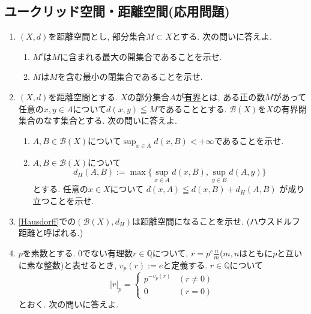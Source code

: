 \documentclass[dvipdfmx,a4paper,11pt]{article}
\newcommand{\Q}{\mathbb{Q}}
\theoremstyle{definition}
\begin{document}
 \begin{center}
\section{ユークリッド空間・距離空間(応用問題)}
\label{sec-11}
\end{center}

 


\begin{enumerate}[label=\textbf{問}\ref*{sec-11}.\arabic*]
 
  \item $(X, d)$を距離空間とし, 部分集合$M\subset X$とする. 
  次の問いに答えよ.

  \begin{enumerate}[label=(\arabic*).]
 \setlength{\parskip}{0cm}
  \setlength{\itemsep}{0pt} 
  \item $M^i$は$M$に含まれる最大の開集合であることを示せ. 
  \item $\overline{M}$は$M$を含む最小の閉集合であることを示せ. 
  \end{enumerate}
    \item \label{Hausdorff} $(X,d)$を距離空間とする.
    $X$の部分集合$A$が\underline{有界}とは, ある正の数$M$があって任意の$x, y \in A$について$d(x,y) \leqq M$であることとする. 
    $\mathcal{B}(X)$を$X$の有界閉集合のなす集合とする. 次の問いに答えよ.
  \begin{enumerate}[label=(\arabic*).]
 \setlength{\parskip}{0cm}
  \setlength{\itemsep}{0pt}
    	\item $A,B \in \mathcal{B}(X)$について$\sup_{x \in A}d(x,B) < + \infty$であることを示せ.
	\item $A,B \in \mathcal{B}(X)$について
	$$
	d_{H}(A,B) := \max \{ \sup_{x \in A}d(x,B), \sup_{y  \in B}d(A,y)\}
	$$
	とする. 任意の$x \in X$について
	$
	d(x,A) \leqq d(x,B) + d_{H}(A,B) 
	$
	が成り立つことを示せ. 
    \end{enumerate}
\item \ref{Hausdorff}での$(\mathcal{B}(X), d_{H})$は距離空間になることを示せ. (ハウスドルフ距離と呼ばれる.)

 
 \item \label{p-adic} $p$を素数とする. 
0でない有理数$r \in \Q$について, $r=p^e\frac{n}{m}$($m,n$はともに$p$と互いに素な整数)と表せるとき, $v_{p}(r):=e$と定義する.
$r \in \Q$について
$$|r|_{p}= \begin{cases} p^{- v_{p}(r)}& (r\neq 0)\\0& (r=0)\end{cases}
$$
とおく. 次の問いに答えよ.


\end{enumerate}
\end{document}
